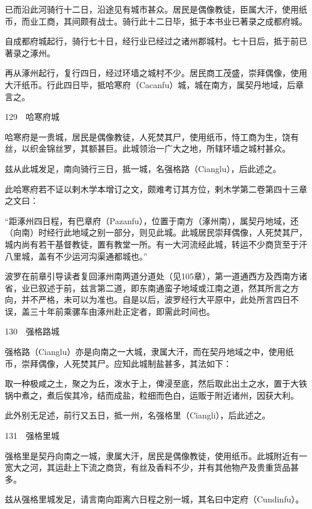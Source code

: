 \documentclass[12pt,UTF8]{ctexbook}
\begin{document}
已而沿此河骑行十二日，沿途见有城市甚众。居民是偶像教徒，臣属大汗，使用纸币，而业工商，其间颇有战士。骑行此十二日毕，抵于本书业已著录之成都府城。

自成都府城起行，骑行七十日，经行业已经过之诸州郡城村。七十日后，抵于前已著录之涿州。

再从涿州起行，复行四日，经过环墙之城村不少。居民商工茂盛，崇拜偶像，使用大汗纸币。行此四日毕，抵哈寒府（Cacanfu）城，城在南方，属契丹地域，后章言之。





129　哈寒府城

哈寒府是一贵城，居民是偶像教徒，人死焚其尸，使用纸币，恃工商为生，饶有丝，以织金锦丝罗，其额甚巨。此城领治一广大之地，所辖环墙之城村甚众。

兹从此城发足，南向骑行三日，抵一城，名强格路（Cianglu），后此述之。

此哈寒府若不证以剌木学本增订之文，颇难考订其方位，剌木学第二卷第四十三章之文曰：

“距涿州四日程，有巴章府（Pazanfu），位置于南方（涿州南），属契丹地域，还（向南）时经行此地域之别一部分，则见此城。此城居民崇拜偶像，人死焚其尸，城内尚有若干基督教徒，置有教堂一所。有一大河流经此城，转运不少商货至于汗八里城，盖有不少运河沟渠通都城也。”

波罗在前章引导读者复回涿州南两道分道处（见105章），第一道通西方及西南方诸省，业已叙述于前，兹言第二道，即东南通蛮子地域或江南之道，然其所言之方向，并不严格，未可以为准也。自是以后，波罗经行大平原中，此处所言四日不误，盖三十年前乘骡车由涿州赴正定者，即需此时间也。





130　强格路城

强格路（Cianglu）亦是向南之一大城，隶属大汗，而在契丹地域之中，使用纸币，崇拜偶像，人死焚其尸。应知此城制盐甚多，其法如下：

取一种极咸之土，聚之为丘，泼水于上，俾浸至底，然后取此出土之水，置于大铁锅中煮之，煮后俟其冷，结而成盐，粒细而色白，运贩于附近诸州，因获大利。

此外别无足述，前行又五日，抵一州，名强格里（Ciangli），后此述之。





131　强格里城

强格里是契丹向南之一城，隶属大汗，居民是偶像教徒，使用纸币。此城附近有一宽大之河，其运赴上下流之商货，有丝及香料不少，并有其他物产及贵重货品甚多。

兹从强格里城发足，请言南向距离六日程之别一城，其名曰中定府（Cundinfu）。
\end{document}
